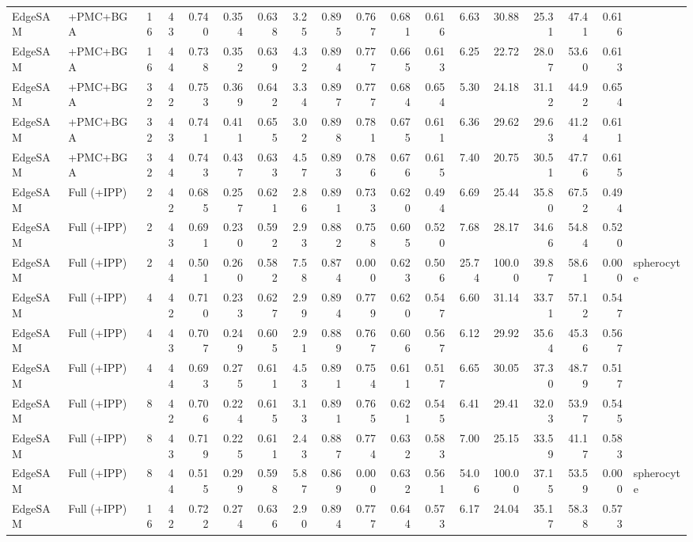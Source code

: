 \documentclass[10pt]{article}
\begin{document}
\begin{landscape}
{\begin{longtable}{l l r r r r r r r r r r r r r r r l}
EdgeSAM & +PMC+BGA & 16 & 43 & 0.740 & 0.354 & 0.638 & 3.25 & 0.895 & 0.767 & 0.681 & 0.616 & 6.63 & 30.88 & 25.31 & 47.41 & 0.616 &  \\
EdgeSAM & +PMC+BGA & 16 & 44 & 0.738 & 0.352 & 0.639 & 4.32 & 0.894 & 0.777 & 0.665 & 0.613 & 6.25 & 22.72 & 28.07 & 53.60 & 0.613 &  \\
EdgeSAM & +PMC+BGA & 32 & 42 & 0.753 & 0.369 & 0.642 & 3.34 & 0.897 & 0.777 & 0.684 & 0.654 & 5.30 & 24.18 & 31.12 & 44.92 & 0.654 &  \\
EdgeSAM & +PMC+BGA & 32 & 43 & 0.741 & 0.411 & 0.655 & 3.02 & 0.898 & 0.781 & 0.675 & 0.611 & 6.36 & 29.62 & 29.63 & 41.24 & 0.611 &  \\
EdgeSAM & +PMC+BGA & 32 & 44 & 0.743 & 0.437 & 0.633 & 4.57 & 0.893 & 0.786 & 0.676 & 0.615 & 7.40 & 20.75 & 30.51 & 47.76 & 0.615 &  \\
EdgeSAM & Full (+IPP) & 2 & 42 & 0.685 & 0.257 & 0.621 & 2.86 & 0.891 & 0.733 & 0.620 & 0.494 & 6.69 & 25.44 & 35.80 & 67.52 & 0.494 &  \\
EdgeSAM & Full (+IPP) & 2 & 43 & 0.691 & 0.230 & 0.592 & 2.93 & 0.882 & 0.758 & 0.605 & 0.520 & 7.68 & 28.17 & 34.66 & 54.84 & 0.520 &  \\
EdgeSAM & Full (+IPP) & 2 & 44 & 0.501 & 0.260 & 0.582 & 7.58 & 0.874 & 0.000 & 0.623 & 0.506 & 25.74 & 100.00 & 39.87 & 58.61 & 0.000 & spherocyte \\
EdgeSAM & Full (+IPP) & 4 & 42 & 0.710 & 0.233 & 0.627 & 2.99 & 0.894 & 0.779 & 0.620 & 0.547 & 6.60 & 31.14 & 33.71 & 57.12 & 0.547 &  \\
EdgeSAM & Full (+IPP) & 4 & 43 & 0.707 & 0.249 & 0.605 & 2.91 & 0.889 & 0.767 & 0.606 & 0.567 & 6.12 & 29.92 & 35.64 & 45.36 & 0.567 &  \\
EdgeSAM & Full (+IPP) & 4 & 44 & 0.693 & 0.275 & 0.611 & 4.53 & 0.891 & 0.754 & 0.611 & 0.517 & 6.65 & 30.05 & 37.30 & 48.79 & 0.517 &  \\
EdgeSAM & Full (+IPP) & 8 & 42 & 0.706 & 0.224 & 0.615 & 3.13 & 0.891 & 0.765 & 0.621 & 0.545 & 6.41 & 29.41 & 32.03 & 53.97 & 0.545 &  \\
EdgeSAM & Full (+IPP) & 8 & 43 & 0.719 & 0.225 & 0.611 & 2.43 & 0.887 & 0.774 & 0.632 & 0.583 & 7.00 & 25.15 & 33.59 & 41.17 & 0.583 &  \\
EdgeSAM & Full (+IPP) & 8 & 44 & 0.515 & 0.299 & 0.598 & 5.87 & 0.869 & 0.000 & 0.632 & 0.561 & 54.06 & 100.00 & 37.15 & 53.59 & 0.000 & spherocyte \\
EdgeSAM & Full (+IPP) & 16 & 42 & 0.722 & 0.274 & 0.636 & 2.90 & 0.894 & 0.777 & 0.644 & 0.573 & 6.17 & 24.04 & 35.17 & 58.38 & 0.573 &  \\

\end{longtable}}
\end{landscape}
\end{document}
